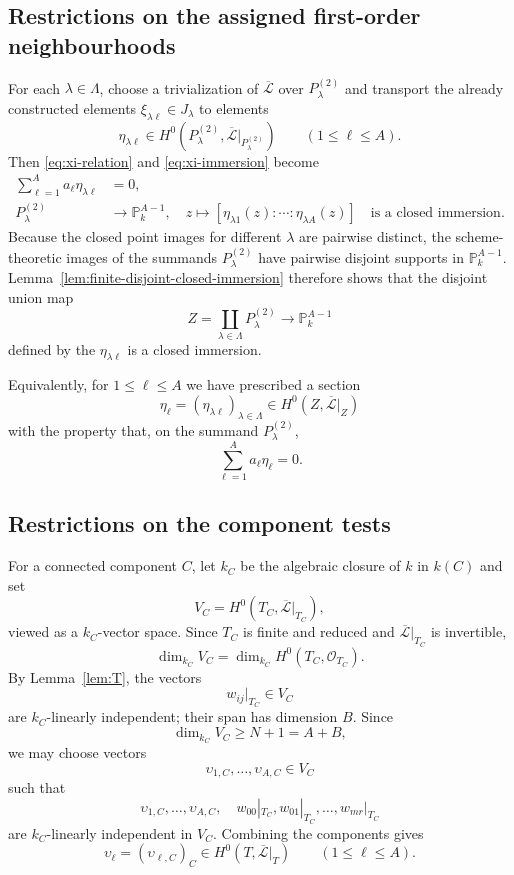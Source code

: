 \documentclass{lms}
\newcommand{\PP}{\mathbb P}
\newcommand{\OO}{\mathcal O}
\newcommand{\LL}{\mathcal L}
\begin{document}
\subsection{Restrictions on the assigned first-order neighbourhoods}

For each $\lambda\in\Lambda$, choose a trivialization of $\overline{\LL}$ over $P_\lambda^{(2)}$ and transport the already constructed elements $\xi_{\lambda\ell}\in J_\lambda$ to elements
\[
        \eta_{\lambda\ell}
        \in H^0(P_\lambda^{(2)},\overline{\LL}|_{P_\lambda^{(2)}})
        \qquad(1\le\ell\le A).
\]
Then \eqref{eq:xi-relation} and \eqref{eq:xi-immersion} become
\begin{align}
        \sum_{\ell=1}^{A}a_\ell\eta_{\lambda\ell}&=0,                 \label{eq:anti-relation}\\
        P_\lambda^{(2)}&\longrightarrow\PP^{A-1}_k,
        \quad z\longmapsto [\eta_{\lambda1}(z):\cdots:\eta_{\lambda A}(z)]
        \quad\text{is a closed immersion.}                       \label{eq:anti-local-immersion}
\end{align}
Because the closed point images for different $\lambda$ are pairwise distinct, the scheme-theoretic images of the summands $P_\lambda^{(2)}$ have pairwise disjoint supports in $\PP^{A-1}_k$.  Lemma~\ref{lem:finite-disjoint-closed-immersion} therefore shows that the disjoint union map
\[
        Z=\coprod_{\lambda\in\Lambda}P_\lambda^{(2)}
        \longrightarrow\PP^{A-1}_k
\]
defined by the $\eta_{\lambda\ell}$ is a closed immersion.

Equivalently, for $1\le\ell\le A$ we have prescribed a section
\[
        \eta_\ell=(\eta_{\lambda\ell})_{\lambda\in\Lambda}
        \in H^0(Z,\overline{\LL}|_Z)
\]
with the property that, on the summand $P_\lambda^{(2)}$,
\begin{equation}\label{eq:anti-Z-global}
        \sum_{\ell=1}^{A}a_\ell\eta_\ell=0.
\end{equation}

\subsection{Restrictions on the component tests}

For a connected component $C$, let $k_C$ be the algebraic closure of $k$ in $k(C)$ and set
\[
        V_C=H^0(T_C,\overline{\LL}|_{T_C}),
\]
viewed as a $k_C$-vector space.  Since $T_C$ is finite and reduced and $\overline{\LL}|_{T_C}$ is invertible,
\[
        \dim_{k_C}V_C=\dim_{k_C}H^0(T_C,\OO_{T_C}).
\]
By Lemma~\ref{lem:T}, the vectors
\[
        w_{ij}|_{T_C}\in V_C
\]
are $k_C$-linearly independent; their span has dimension $B$.  Since
\[
        \dim_{k_C}V_C\ge N+1=A+B,
\]
we may choose vectors
\[
        \upsilon_{1,C},\ldots,\upsilon_{A,C}\in V_C
\]
such that
\begin{equation}\label{eq:component-basis}
        \upsilon_{1,C},\ldots,\upsilon_{A,C},
        \quad
        w_{00}|_{T_C},w_{01}|_{T_C},\ldots,w_{mr}|_{T_C}
\end{equation}
are $k_C$-linearly independent in $V_C$.  Combining the components gives
\[
        \upsilon_\ell=(\upsilon_{\ell,C})_C
        \in H^0(T,\overline{\LL}|_T)
        \qquad(1\le\ell\le A).
\]
\end{document}
